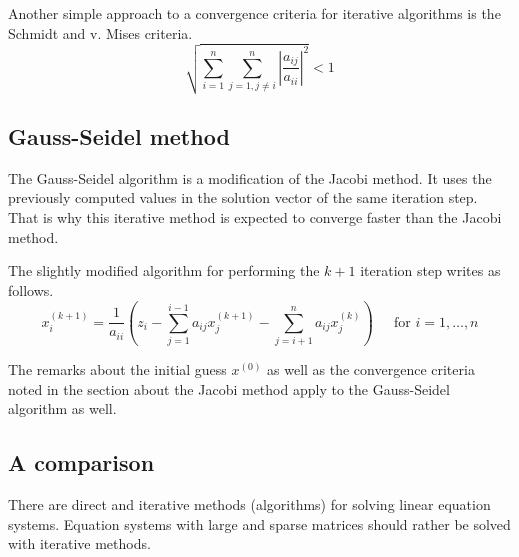 \addvspace{12pt}

Another simple approach to a convergence criteria for iterative
algorithms is the Schmidt and v. Mises criteria.
\begin{equation}
\sqrt{\sum_{i = 1}^n \sum_{j = 1, j \ne i}^n \left|\dfrac{a_{ij}}{a_{ii}}\right|^2} < 1
\end{equation}

\subsection{Gauss-Seidel method}

The Gauss-Seidel algorithm is a modification of the Jacobi method.  It
uses the previously computed values in the solution vector of the same
iteration step.  That is why this iterative method is expected to
converge faster than the Jacobi method.

\addvspace{12pt}

The slightly modified algorithm for performing the $k + 1$ iteration
step writes as follows.
\begin{equation}
x_{i}^{(k+1)} = \dfrac{1}{a_{ii}}\left(z_i - \sum_{j=1}^{i-1} a_{ij}x_{j}^{(k+1)} - \sum_{j=i+1}^{n} a_{ij}x_{j}^{(k)}\right)
\;\;\;\; \textrm{ for } i = 1, \ldots, n
\end{equation}

The remarks about the initial guess $x^{(0)}$ as well as the
convergence criteria noted in the section about the Jacobi method
apply to the Gauss-Seidel algorithm as well.

\subsection{A comparison}

There are direct and iterative methods (algorithms) for solving linear
equation systems.  Equation systems with large and sparse matrices
should rather be solved with iterative methods.

\addvspace{12pt}

